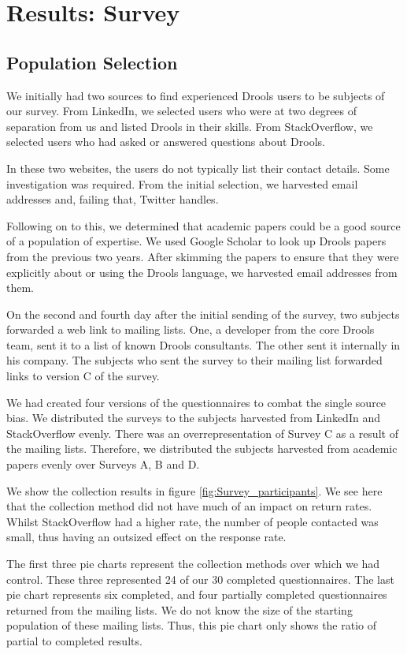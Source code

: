 \section{Results: Survey}
\label{section:survey_results}

\subsection{Population Selection}
We initially had two sources to find experienced Drools users to be subjects of our survey.
From LinkedIn, we selected users who were at two degrees of separation from us and listed Drools in their skills.
From StackOverflow, we selected users who had asked or answered questions about Drools.

In these two websites, the users do not typically list their contact details.
Some investigation was required.
From the initial selection, we harvested email addresses and, failing that, Twitter handles.

Following on to this, we determined that academic papers could be a good source of a population of expertise.
We used Google Scholar to look up Drools papers from the previous two years.
After skimming the papers to ensure that they were explicitly about or using the Drools language, we harvested email addresses from them.

On the second and fourth day after the initial sending of the survey, two subjects forwarded a web link to mailing lists.
One, a developer from the core Drools team, sent it to a list of known Drools consultants.
The other sent it internally in his company.
The subjects who sent the survey to their mailing list forwarded links to version C of the survey.

We had created four versions of the questionnaires to combat the single source bias.
We distributed the surveys to the subjects harvested from LinkedIn and StackOverflow evenly.
There was an overrepresentation of Survey C as a result of the mailing lists.
Therefore, we distributed the subjects harvested from academic papers evenly over Surveys A, B and D.

We show the collection results in figure \ref{fig:Survey_participants}.
We see here that the collection method did not have much of an impact on return rates.
Whilst StackOverflow had a higher rate, the number of people contacted was small, thus having an outsized effect on the response rate.

The first three pie charts represent the collection methods over which we had control.
These three represented 24 of our 30 completed questionnaires.
The last pie chart represents six completed, and four partially completed questionnaires returned from the mailing lists.
We do not know the size of the starting population of these mailing lists. 
Thus, this pie chart only shows the ratio of partial to completed results.

